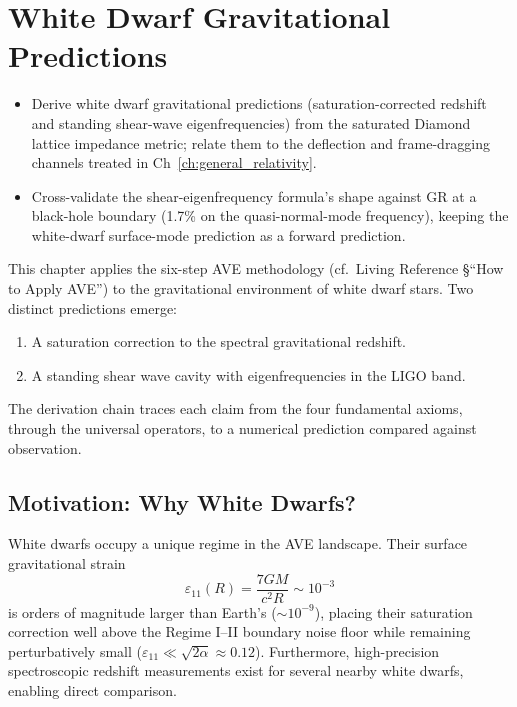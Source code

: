 \chapter{White Dwarf Gravitational Predictions}
\label{ch:white_dwarf_predictions}


\begin{objectivebox}
\begin{itemize}
    \item Derive white dwarf gravitational predictions (saturation-corrected redshift and standing shear-wave eigenfrequencies) from the saturated Diamond lattice impedance metric; relate them to the deflection and frame-dragging channels treated in Ch~\ref{ch:general_relativity}.
    \item Cross-validate the shear-eigenfrequency formula's shape against GR at a black-hole boundary (1.7\% on the quasi-normal-mode frequency), keeping the white-dwarf surface-mode prediction as a forward prediction.
\end{itemize}
\end{objectivebox}

This chapter applies the six-step AVE methodology (cf.\ Living Reference \S``How to Apply AVE'')
to the gravitational environment of white dwarf stars.  Two distinct predictions emerge:
\begin{enumerate}
    \item A saturation correction to the spectral gravitational redshift.
    \item A standing shear wave cavity with eigenfrequencies in the LIGO band.
\end{enumerate}
The derivation chain traces each claim from the four fundamental axioms,
through the universal operators, to a numerical prediction compared against observation.

\section{Motivation: Why White Dwarfs?}

White dwarfs occupy a unique regime in the AVE landscape.
Their surface gravitational strain
\begin{equation}
    \varepsilon_{11}(R) = \frac{7GM}{c^2 R} \sim 10^{-3}
\end{equation}
is orders of magnitude larger than Earth's ($\sim 10^{-9}$),
placing their saturation correction well above the Regime I--II boundary noise floor
while remaining perturbatively small ($\varepsilon_{11} \ll \sqrt{2\alpha} \approx 0.12$).
Furthermore, high-precision spectroscopic redshift measurements exist
for several nearby white dwarfs, enabling direct comparison.

